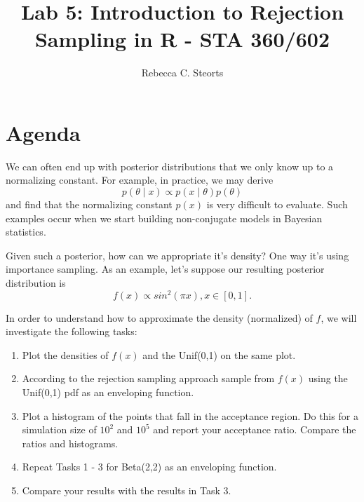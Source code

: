 \documentclass{article}
\begin{document}
\title{Lab 5: Introduction to Rejection Sampling in \textsf{R} - STA 360/602}
\author{Rebecca C. Steorts}
\date{}
\maketitle


\section{Agenda}

We can often end up with posterior distributions that we only know up to a normalizing constant. For example, in practice, we may derive $$p(\theta \mid x) \propto p(x\mid \theta) p(\theta)$$ and find that the normalizing constant $p(x)$ is very difficult to evaluate. Such examples occur when we start building non-conjugate models in Bayesian statistics. 

Given such a posterior, how can we appropriate it's density? One way it's using importance sampling. As an example, let's suppose our resulting posterior distribution is 
$$f(x) \propto sin^2(\pi x), x \in [0,1].$$

In order to understand how to approximate the density (normalized) of $f$, we will investigate the following tasks:

\begin{enumerate}
\item Plot the densities of $f(x)$ and the Unif(0,1) on the same plot. 
\item According to the rejection sampling approach sample from $f(x)$ using the Unif(0,1) pdf as an enveloping function.
\item Plot a histogram of the points that fall in the acceptance region. Do this for a simulation size of $10^2$ and $10^5$ and report your acceptance ratio. Compare the ratios and histograms.
\item Repeat Tasks 1 - 3 for  Beta(2,2) as an enveloping function. 
\item Compare your results with the results in Task 3.
\end{enumerate}
\end{document}

